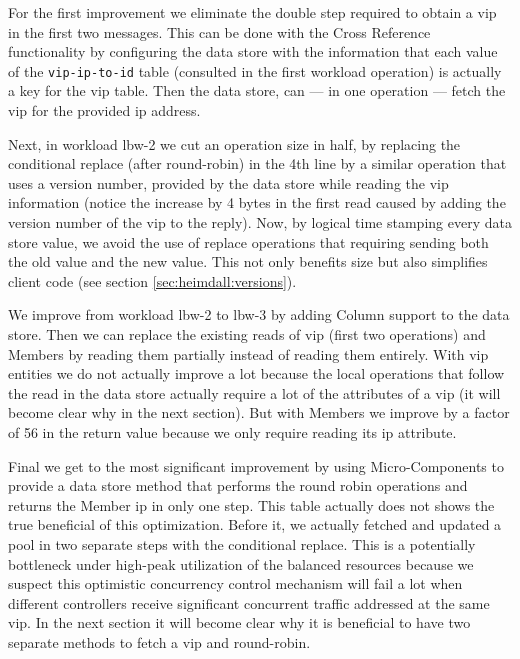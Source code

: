 For the first improvement we eliminate the double step required to
obtain a \gls{vip} in the first two messages. This can be done with
the Cross Reference functionality by configuring the data store with
the information that each value of the \texttt{vip-ip-to-id} table
(consulted in the first workload operation) is actually a key for
the \gls{vip} table. Then the data store, can  --- in one operation
--- fetch the \gls{vip} for the provided \gls{ip} address. 

Next, in workload lbw-2 we cut an operation size in half, by replacing the conditional
replace (after round-robin) in the 4th line by a similar operation
that uses a version number, provided by the data store while reading
the \gls{vip} information (notice the increase by 4 bytes in the first
read caused by adding the version number of the \gls{vip} to the
reply). Now, by logical time stamping every data store value, we avoid
the use of replace operations that requiring sending both the old
value and the new value. This not only benefits size but also
simplifies client code (see section \ref{sec:heimdall:versions}). 


We improve from workload lbw-2 to lbw-3 by adding Column support to
the data store. Then we can replace the existing reads of \gls{vip}
(first two operations) and Members by reading  them partially instead
of reading them entirely. With \gls{vip} entities we do not actually
improve a lot because the local operations that follow the read in the
data store actually require a lot of the attributes of a \gls{vip} (it
will become clear why in the next section). But with Members we
improve by a factor of 56 in the return value because we only require
reading its \gls{ip} attribute. 

Final we get to the most significant improvement by using
Micro-Components to provide a data store method that performs the
round robin operations and returns the Member \gls{ip} in only one
step. This table actually does not shows the true beneficial of this
optimization. Before it, we actually fetched and updated a pool in two
separate steps with the conditional replace. This is a potentially
bottleneck under high-peak utilization of the balanced resources
because we suspect this optimistic concurrency control mechanism will
fail a lot when different controllers receive significant concurrent
traffic addressed at the same \gls{vip}.  In the next section it will become clear why it is beneficial
to have two separate methods to fetch a \gls{vip} and round-robin. \\

